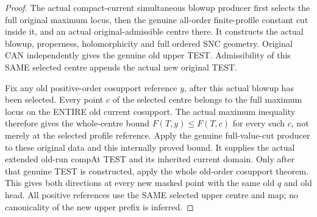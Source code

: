 \begin{proof}
The actual compact-current simultaneous blowup producer first selects the
full original maximum locus, then the genuine all-order finite-profile
constant cut inside it, and an actual original-admissible centre there.
It constructs the actual blowup, properness, holomorphicity and full
ordered SNC geometry. Original CAN independently gives the genuine old
upper TEST. Admissibility of this SAME selected centre appends the actual
new original TEST.

Fix any old positive-order cosupport reference $y$, after this actual
blowup has been selected. Every point $c$ of the selected centre belongs
to the full maximum locus on the ENTIRE old current cosupport. The actual
maximum inequality therefore gives the whole-centre bound $F(T,y)\le
F(T,c)$ for every such $c$, not merely at the selected profile reference.
Apply the genuine full-value-cut producer to these original data and this
internally proved bound. It supplies the actual extended old-run compAt
TEST and its inherited current domain. Only after that genuine TEST is
constructed, apply the whole old-order cosupport theorem. This gives both
directions at every new masked point with the same old $q$ and old head.
All positive references use the SAME selected upper centre and map; no
canonicality of the new upper prefix is inferred.
\end{proof}

